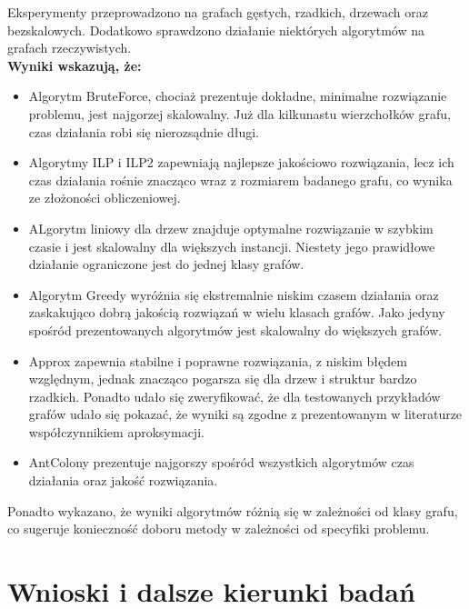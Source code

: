 Eksperymenty przeprowadzono na grafach gęstych, rzadkich, drzewach oraz bezskalowych. Dodatkowo sprawdzono działanie niektórych algorytmów na grafach rzeczywistych. \\
\textbf{Wyniki wskazują, że:}
\begin{itemize}
    \item Algorytm BruteForce, chociaż prezentuje dokładne, minimalne rozwiązanie problemu, jest najgorzej skalowalny. Już dla kilkunastu wierzchołków grafu, czas działania robi się nierozsądnie długi.
    \item Algorytmy ILP i ILP2 zapewniają najlepsze jakościowo rozwiązania, lecz ich czas działania rośnie znacząco wraz z rozmiarem badanego grafu, co wynika ze złożoności obliczeniowej.
    \item ALgorytm liniowy dla drzew znajduje optymalne rozwiązanie w szybkim czasie i jest skalowalny dla większych instancji. Niestety jego prawidłowe działanie ograniczone jest do jednej klasy grafów.
    \item Algorytm Greedy wyróżnia się ekstremalnie niskim czasem działania oraz zaskakująco dobrą jakością rozwiązań w wielu klasach grafów. Jako jedyny spośród prezentowanych algorytmów jest skalowalny do większych grafów.
    \item Approx zapewnia stabilne i poprawne rozwiązania, z niskim błędem względnym, jednak znacząco pogarsza się dla drzew i struktur bardzo rzadkich. Ponadto udało się zweryfikować, że dla testowanych przykładów grafów udało się pokazać, że wyniki są zgodne z prezentowanym w literaturze współczynnikiem aproksymacji.
    \item AntColony prezentuje najgorszy spośród wszystkich algorytmów czas działania oraz jakość rozwiązania.
\end{itemize}

Ponadto wykazano, że wyniki algorytmów różnią się w zależności od klasy grafu, co sugeruje konieczność doboru metody w zależności od specyfiki problemu.

\section{Wnioski i dalsze kierunki badań}

